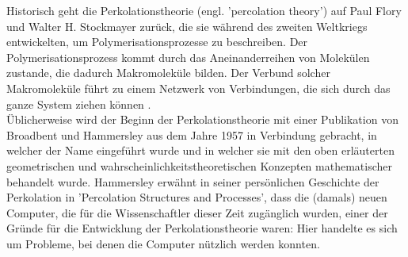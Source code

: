 \documentclass[a4paper, 12pt]{report}
\begin{document}
\noindent Historisch geht die Perkolationstheorie (engl. 'percolation theory') auf Paul Flory und Walter H. Stockmayer zurück, die sie während des zweiten Weltkriegs entwickelten, um Polymerisationsprozesse zu beschreiben. Der Polymerisationsprozess kommt durch das Aneinanderreihen von Molekülen zustande, die dadurch Makromoleküle bilden. Der Verbund solcher Makromoleküle führt zu einem Netzwerk von Verbindungen, die sich durch das ganze System ziehen können \cite{Wiki_Perkolationstheorie}.
\\
\noindent Üblicherweise wird der Beginn der Perkolationstheorie mit einer Publikation von Broadbent  und Hammersley aus dem Jahre 1957 in Verbindung gebracht, in welcher der Name eingeführt wurde und in welcher sie mit den oben erläuterten geometrischen und wahrscheinlichkeitstheoretischen Konzepten mathematischer behandelt wurde. Hammersley erwähnt in seiner persönlichen Geschichte der Perkolation in 'Percolation Structures and Processes', dass die (damals) neuen Computer, die für die Wissenschaftler dieser Zeit zugänglich wurden, einer der Gründe für die Entwicklung der Perkolationstheorie waren: Hier handelte es sich um Probleme, bei denen die Computer nützlich werden konnten.
\end{document}
